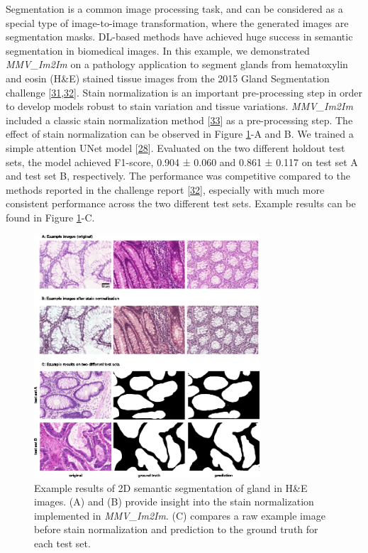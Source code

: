 Segmentation is a common image processing task, and can be considered as a special type of image-to-image transformation, where the generated images are segmentation masks. DL-based methods have achieved huge success in semantic segmentation in biomedical images. In this example, we demonstrated \emph{MMV\_Im2Im} on a pathology application to segment glands from hematoxylin and eosin (H\&E) stained tissue images from the 2015 Gland Segmentation challenge {[}\protect\hyperlink{ref-45Sirz1X}{31},\protect\hyperlink{ref-XAffSYIR}{32}{]}. Stain normalization is an important pre-processing step in order to develop models robust to stain variation and tissue variations. \emph{MMV\_Im2Im} included a classic stain normalization method {[}\protect\hyperlink{ref-tQhnZyjK}{33}{]} as a pre-processing step. The effect of stain normalization can be observed in Figure \ref{fig:2d_gland}-A and B. We trained a simple attention UNet model {[}\protect\hyperlink{ref-OCow1hly}{28}{]}. Evaluated on the two different holdout test sets, the model achieved F1-score, 0.904 ± 0.060 and 0.861 ± 0.117 on test set A and test set B, respectively. The performance was competitive compared to the methods reported in the challenge report {[}\protect\hyperlink{ref-XAffSYIR}{32}{]}, especially with much more consistent performance across the two different test sets. Example results can be found in Figure \ref{fig:2d_gland}-C.

\begin{figure}
\hypertarget{fig:2d_gland}{%
\centering
\includegraphics[width=0.75\textwidth,height=\textheight]{images/2d_semantic_seg_justin.png}
\caption{Example results of 2D semantic segmentation of gland in H\&E images. (A) and (B) provide insight into the stain normalization implemented in \emph{MMV\_Im2Im}. (C) compares a raw example image before stain normalization and prediction to the ground truth for each test set.}\label{fig:2d_gland}
}
\end{figure}

